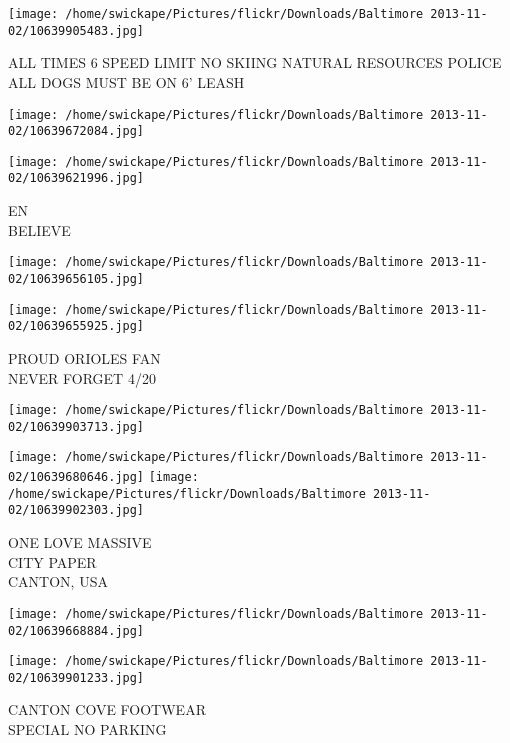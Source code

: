 \documentclass[10pt,letterpaper]{article}
\begin{document}
\vspace{0.25in}
\texttt{[image: /home/swickape/Pictures/flickr/Downloads/Baltimore 2013-11-02/10639905483.jpg]}

ALL TIMES 6 SPEED LIMIT NO SKIING NATURAL RESOURCES POLICE\\
ALL DOGS MUST BE ON 6' LEASH\\
\pagebreak

\texttt{[image: /home/swickape/Pictures/flickr/Downloads/Baltimore 2013-11-02/10639672084.jpg]}

\vspace{0.25in}
\texttt{[image: /home/swickape/Pictures/flickr/Downloads/Baltimore 2013-11-02/10639621996.jpg]}

EN\\
BELIEVE\\
\pagebreak

\texttt{[image: /home/swickape/Pictures/flickr/Downloads/Baltimore 2013-11-02/10639656105.jpg]}

\vspace{0.25in}
\texttt{[image: /home/swickape/Pictures/flickr/Downloads/Baltimore 2013-11-02/10639655925.jpg]}

PROUD ORIOLES FAN\\
NEVER FORGET 4/20\\
\pagebreak

\texttt{[image: /home/swickape/Pictures/flickr/Downloads/Baltimore 2013-11-02/10639903713.jpg]}

\vspace{0.25in}
\texttt{[image: /home/swickape/Pictures/flickr/Downloads/Baltimore 2013-11-02/10639680646.jpg]}
\texttt{[image: /home/swickape/Pictures/flickr/Downloads/Baltimore 2013-11-02/10639902303.jpg]}

ONE LOVE MASSIVE\\
CITY PAPER\\
CANTON, USA\\
\pagebreak

\texttt{[image: /home/swickape/Pictures/flickr/Downloads/Baltimore 2013-11-02/10639668884.jpg]}

\vspace{0.25in}
\texttt{[image: /home/swickape/Pictures/flickr/Downloads/Baltimore 2013-11-02/10639901233.jpg]}

CANTON COVE FOOTWEAR\\
SPECIAL NO PARKING\\
\pagebreak
\end{document}
